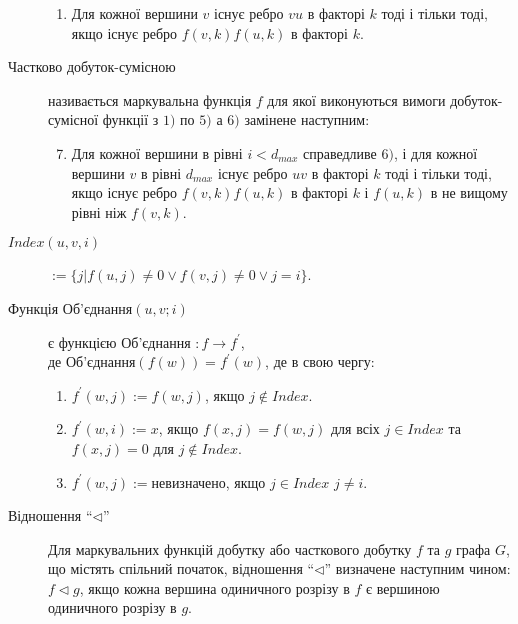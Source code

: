 \begin{description}
\begin{enumerate}
    \item Для кожної вершини $v$ існує ребро $vu$ в факторі $k$ тоді і тільки тоді, якщо існує ребро $f(v,k)f(u,k)$ в факторі $k$.
  \end{enumerate}
  \item[Частково добуток-сумісною] називається маркувальна функція $f$ для якої виконуються вимоги добуток-сумісної функції з $1)$ по $5)$ а $6)$ замінене наступним:
    \begin{enumerate}
      \setcounter{enumi}{6}
      \item Для кожної вершини в рівні $i < d_{max}$ справедливе $6)$, і для кожної вершини $v$ в рівні $d_{max}$ існує ребро $uv$ в факторі $k$ тоді і тільки тоді, якщо існує ребро $f(v,k)f(u,k)$ в факторі $k$ і $f(u,k)$ в не вищому рівні ніж $f(v,k)$.
    \end{enumerate}
    \item[$Index(u,v,i)$] $:=\lbrace j \vert f(u,j) \ne 0 \lor f(v,j) \ne 0 \lor j = i \rbrace$.
    \item[Функція Об'єднання$(u,v;i)$] є функцією Об'єднання $: f \to f^\prime$,\\
      де Об'єднання$(f(w))=f^\prime(w)$, де в свою чергу:
      \begin{enumerate}
        \item $f^\prime(w,j):=f(w,j)$, якщо $j \not\in Index$.
        \item $f^\prime(w,i):=x$, якщо $f(x,j)=f(w,j)$ для всіх $j \in Index$ та $f(x,j) = 0$ для $j \not\in Index$.
        \item $f^\prime(w,j):=$невизначено, якщо $j \in Index$ $j \ne i$.
      \end{enumerate}
      \item[Відношення ``$\triangleleft$''] Для маркувальних функцій добутку або часткового добутку $f$ та $g$ графа $G$, що містять спільний початок, відношення ``$\triangleleft$'' визначене наступним чином: $f \triangleleft g$, якщо кожна вершина одиничного розрізу в $f$ є вершиною одиничного розрізу в $g$.
\end{description}
